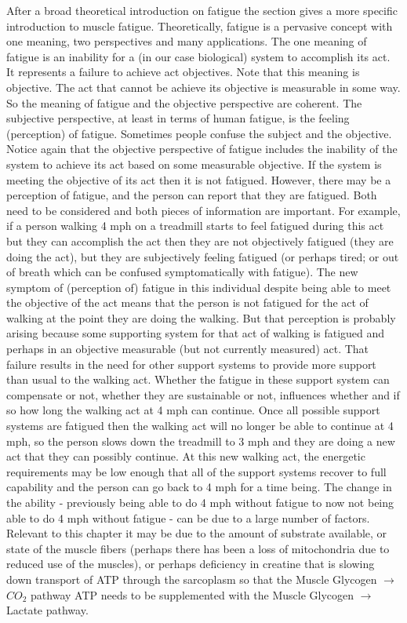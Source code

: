 After a broad theoretical introduction on fatigue the section gives a more specific introduction to muscle fatigue. Theoretically, fatigue is a pervasive concept with one meaning, two perspectives and many applications. The one meaning of fatigue is an inability for a (in our case biological) system to accomplish its act. It represents a failure to achieve act objectives. Note that this meaning is objective. The act that cannot be achieve its objective is measurable in some way. So the meaning of fatigue and the objective perspective are coherent. The subjective perspective, at least in terms of human fatigue, is the feeling (perception) of fatigue. Sometimes people confuse the subject and the objective. Notice again that the objective perspective of fatigue includes the inability of the system to achieve its act based on some measurable objective. If the system is meeting the objective of its act then it is not fatigued. However, there may be a perception of fatigue, and the person can report that they are fatigued. Both need to be considered and both pieces of information are important. For example, if a person walking 4 mph on a treadmill starts to feel fatigued during this act but they can accomplish the act then they are not objectively fatigued (they are doing the act), but they are subjectively feeling fatigued (or perhaps tired; or out of breath which can be confused symptomatically with fatigue). The new symptom of (perception of) fatigue in this individual despite being able to meet the objective of the act means that the person is not fatigued for the act of walking at the point they are doing the walking. But that perception is probably arising because some supporting system for that act of walking is fatigued and perhaps in an objective measurable (but not currently measured) act. That failure results in the need for other support systems to provide more support than usual to the walking act. Whether the fatigue in these support system can compensate or not, whether they are sustainable or not, influences whether and if so how long the walking act at 4 mph can continue. Once all possible support systems are fatigued then the walking act will no longer be able to continue at 4 mph, so the person slows down the treadmill to 3 mph and they are doing a new act that they can possibly continue. At this new walking act, the energetic requirements may be low enough that all of the support systems recover to full capability and the person can go back to 4 mph for a time being. The change in the ability - previously being able to do 4 mph without fatigue to now not being able to do 4 mph without fatigue - can be due to a large number of factors. Relevant to this chapter it may be due to the amount of substrate available, or state of the muscle fibers (perhaps there has been a loss of mitochondria due to reduced use of the muscles), or perhaps deficiency in creatine that is slowing down transport of ATP through the sarcoplasm so that the Muscle Glycogen $\rightarrow$ $CO_2$ pathway ATP needs to be supplemented with the Muscle Glycogen $\rightarrow$ Lactate pathway.

